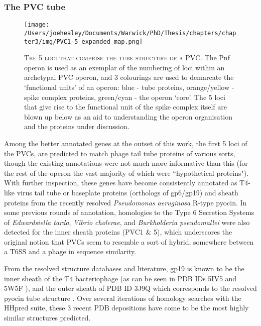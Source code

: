 \subsubsection{The PVC tube}
\begin{figure}[h!]
\texttt{[image: /Users/joehealey/Documents/Warwick/PhD/Thesis/chapters/chapter3/img/PVC1-5\_expanded\_map.png]}
	\captionsetup{singlelinecheck=off, justification=justified, font=footnotesize, aboveskip=10pt}
	\caption[Tube protein region of a PVC operon]{\textsc{\normalsize The 5 loci that comprise the tube structure of a PVC.}\vspace{0.1cm} \newline The Pnf operon is used as an exemplar of the numbering of loci within an archetypal PVC operon, and 3 colourings are used to demarcate the `functional units' of an operon: blue - tube proteins, orange/yellow - spike complex proteins, green/cyan - the operon `core'. The 5 loci that give rise to the functional unit of the spike complex itself are blown up below as an aid to understanding the operon organisation and the proteins under discussion.}
	\label{PVC1-5map}
\end{figure}


Among the better annotated genes at the outset of this work, the first 5 loci of the PVCs, are predicted to match phage tail tube proteins of various sorts, though the existing annotations were not much more informative than this (for the rest of the operon the vast majority of which were ``hypothetical proteins"). With further inspection, these genes have become consistently annotated as T4-like virus tail tube or baseplate proteins (orthologs of gp6/gp19) and sheath proteins from the recently resolved \emph{Pseudomonas aeruginosa} R-type pyocin. In some previous rounds of annotation, homologies to the Type 6 Secretion Systems of \emph{Edwardsiella tarda}, \emph{Vibrio cholerae}, and \emph{Burkholderia pseudomallei} were also detected for the inner sheath proteins (PVC1 \& 5), which underscores the original notion that PVCs seem to resemble a sort of hybrid, somewhere between a T6SS and a phage in sequence similarity.

From the resolved structure databases and literature, gp19 is known to be the inner sheath of the T4 bacteriophage (as can be seen in PDB IDs 5IV5 and 5W5F \citep{Taylor2016, Zheng2017}), and the outer sheath of PDB ID 3J9Q which corresponds to the resolved pyocin tube structure \citep{Ge2015a}. Over several iterations of homology searches with the HHpred suite, these 3 recent PDB depositions have come to be the most highly similar structures predicted.

